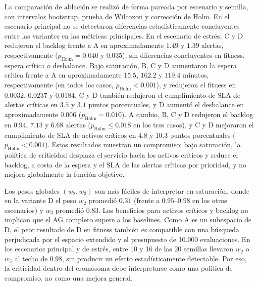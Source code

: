 \documentclass[12pt,a4paper,twocolumn]{article}
\begin{document}
La comparación de ablación se realizó de forma pareada por escenario y semilla, con intervalos bootstrap, prueba de Wilcoxon y corrección de Holm. En el escenario principal no se detectaron diferencias estadísticamente concluyentes entre las variantes en las métricas principales. En el escenario de estrés, C y D redujeron el backlog frente a A en aproximadamente $1.49$ y $1.39$ alertas, respectivamente ($p_\mathrm{Holm}=0.040$ y $0.035$), sin diferencias concluyentes en fitness, espera crítica o desbalance. Bajo saturación, B, C y D aumentaron la espera crítica frente a A en aproximadamente $15.5$, $162.2$ y $119.4$ minutos, respectivamente (en todos los casos, $p_\mathrm{Holm}<0.001$), y redujeron el fitness en $0.0032$, $0.0237$ y $0.0184$. C y D también redujeron el cumplimiento de SLA de alertas críticas en $3.5$ y $3.1$ puntos porcentuales, y D aumentó el desbalance en aproximadamente $0.006$ ($p_\mathrm{Holm}=0.010$). A cambio, B, C y D redujeron el backlog en $0.94$, $7.13$ y $6.68$ alertas ($p_\mathrm{Holm}\leq 0.018$ en los tres casos), y C y D mejoraron el cumplimiento de SLA de activos críticos en $4.8$ y $10.3$ puntos porcentuales ($p_\mathrm{Holm}<0.001$). Estos resultados muestran un compromiso: bajo saturación, la política de criticidad desplaza el servicio hacia los activos críticos y reduce el backlog, a costa de la espera y el SLA de las alertas críticas por prioridad, y no mejora globalmente la función objetivo.

Los pesos globales $(w_2,w_3)$ son más fáciles de interpretar en saturación, donde en la variante D el peso $w_2$ promedió $0.31$ (frente a $0.95$--$0.98$ en los otros escenarios) y $w_3$ promedió $0.83$. Los beneficios para activos críticos y backlog no implican que el AG completo supere a los baselines. Como A es un subespacio de D, el peor resultado de D en fitness también es compatible con una búsqueda perjudicada por el espacio extendido y el presupuesto de 10.000 evaluaciones. En los escenarios principal y de estrés, entre 10 y 16 de las 20 semillas llevaron $w_2$ o $w_3$ al techo de $0.98$, sin producir un efecto estadísticamente detectable. Por eso, la criticidad dentro del cromosoma debe interpretarse como una política de compromiso, no como una mejora general.
\end{document}
